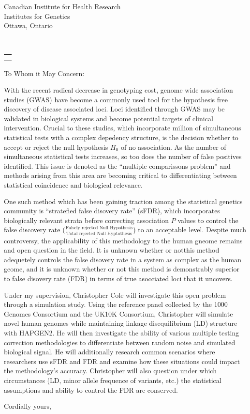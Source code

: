 \documentclass{letter}
\makeatletter
\renewcommand*{\opening}[1]{\ifx\@empty\fromaddress%
  \thispagestyle{firstpage}%
    {\raggedleft\@date\par}%
  \else%
   \thispagestyle{empty}%
   {%
    \begin{minipage}[c]{0.50\linewidth}
    \toname \\
    \toaddress
    \end{minipage}
    \begin{minipage}[c]{0.45\linewidth}
    \raggedleft\begin{tabular}{l@{}}\ignorespaces
    \fromaddress\\[0.0em]%
    \@date
    \end{tabular}
    \end{minipage}
    \par
}%
  \fi
  \vspace{2\parskip}%
  #1\par\nobreak}
\makeatother
\begin{document}
\begin{letter}{Canadian Institute for Health Research \\ Institutes for Genetics \\ Ottawa, Ontario}
\opening{To Whom it May Concern:}
\thispagestyle{fancy}
\setlength{\parindent}{0.5cm}


With the recent radical decrease in genotyping cost, genome wide association studies (GWAS) have become a commonly used tool for the hypothesis free discovery of disease associated loci. Loci identified through GWAS may be validated in biological systems and become potential targets of clinical intervention. Crucial to these studies, which incorporate million of simultaneous statistical tests with a complex depedency structure, is the decision whether to accept or reject the null hypothesis $H_0$ of no association. As the number of simultaneous statistical tests increases, so too does the number of false positives identified. This issue is denoted as the ``multiple comparissons problem'' and methods arising from this area are becoming critical to differentiating between statistical coincidence and biological relevance. 

One such method which has been gaining traction among the statistical genetics community is ``stratefied false disovery rate'' (sFDR), which incorporates biologically relevant strata before correcting association $P$ values to control the false discovery rate ($\frac{\text{Falsely rejected Null Hypothesis}}{\text{Total rejected Null Hyptothesis}}$) to an acceptable level. Despite much controversy, the applicability of this methodology to the human gneome remains and open question in the field. It is unknown whether or notthis method adequetely controls the false disovery rate in a system as complex as the human geome, and it is unknown whether or not this method is demonstrably superior to false disovery rate (FDR) in terms of true asocciated loci that it uncovers. 

Under my supervision, Christopher Cole will investigate this open problem through a simulation study. Using the reference panel collected by the 1000 Genomes Consortium and the UK10K Consortium, Christopher will simulate novel human genomes while maintaining linkage disequilibrium (LD) structure with HAPGEN2. He will then investigate the ability of various multiple testing correction methodologies to differentiate between random noise and simulated biological signal. He will additionally research common scenarios where researchers use sFDR and FDR and examine how these situations could impact the methodology's accuracy. Christopher will also question under which circumstances (LD, minor allele frequence of variants, etc.) the statistical assumptions and ability to control the FDR are conserved.  



\closing{Cordially yours,}
\end{letter}
\end{document}
